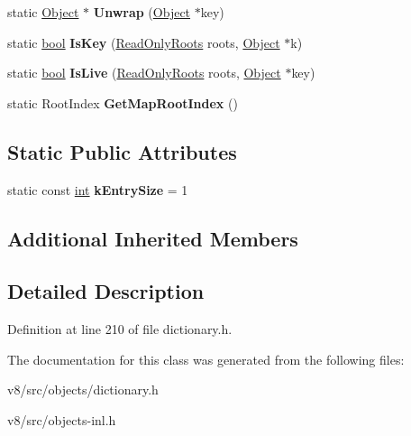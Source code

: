 \begin{DoxyCompactItemize}
static \mbox{\hyperlink{classv8_1_1internal_1_1Object}{Object}} $\ast$ {\bfseries Unwrap} (\mbox{\hyperlink{classv8_1_1internal_1_1Object}{Object}} $\ast$key)
\item 
\mbox{\label{classv8_1_1internal_1_1GlobalDictionaryShape_a52470bc9e05518441623c2043cb41795}} 
static \mbox{\hyperlink{classbool}{bool}} {\bfseries Is\+Key} (\mbox{\hyperlink{classv8_1_1internal_1_1ReadOnlyRoots}{Read\+Only\+Roots}} roots, \mbox{\hyperlink{classv8_1_1internal_1_1Object}{Object}} $\ast$k)
\item 
\mbox{\label{classv8_1_1internal_1_1GlobalDictionaryShape_a2a8f09a01e489786d12742f0beb951b2}} 
static \mbox{\hyperlink{classbool}{bool}} {\bfseries Is\+Live} (\mbox{\hyperlink{classv8_1_1internal_1_1ReadOnlyRoots}{Read\+Only\+Roots}} roots, \mbox{\hyperlink{classv8_1_1internal_1_1Object}{Object}} $\ast$key)
\item 
\mbox{\label{classv8_1_1internal_1_1GlobalDictionaryShape_a104a12650c57f2a85b07f7a3522baaf8}} 
static Root\+Index {\bfseries Get\+Map\+Root\+Index} ()
\end{DoxyCompactItemize}
\subsection*{Static Public Attributes}
\begin{DoxyCompactItemize}
\item 
\mbox{\label{classv8_1_1internal_1_1GlobalDictionaryShape_a1106aeafb8612e48b391e6aeb1f051be}} 
static const \mbox{\hyperlink{classint}{int}} {\bfseries k\+Entry\+Size} = 1
\end{DoxyCompactItemize}
\subsection*{Additional Inherited Members}


\subsection{Detailed Description}


Definition at line 210 of file dictionary.\+h.



The documentation for this class was generated from the following files\+:\begin{DoxyCompactItemize}
\item 
v8/src/objects/dictionary.\+h\item 
v8/src/objects-\/inl.\+h\end{DoxyCompactItemize}
